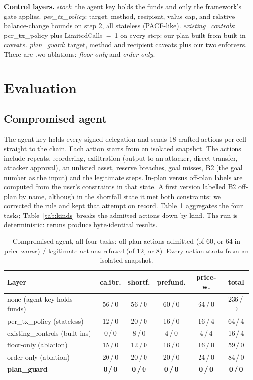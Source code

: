 \documentclass[conference]{IEEEtran}
\begin{document}
\textbf{Control layers.} \emph{stock}: the agent key holds the funds and only the framework's gate applies.
\emph{per\_tx\_policy}: target, method, recipient, value cap, and relative balance-change bounds on step 2, all
stateless (PACE-like). \emph{existing\_controls}: per\_tx\_policy plus LimitedCalls~=~1 on every step: our plan
built from built-in caveats. \emph{plan\_guard}: target, method and recipient caveats plus our two enforcers. There are two
ablations: \emph{floor-only} and \emph{order-only}.

\section{Evaluation}\label{sec:eval}

\subsection{Compromised agent}

The agent key holds every signed delegation and sends 18 crafted actions per cell straight to the chain. Each
action starts from an isolated snapshot. The actions include repeats, reordering, exfiltration (output to an attacker,
direct transfer, attacker approval), an unlisted asset, reserve breaches, goal misses, B2 (the goal number as the
input) and the legitimate steps. In-plan versus off-plan labels are computed from the user's constraints in that state. A first
version labelled B2 off-plan by name, although in the shortfall state it met both constraints; we corrected the rule
and kept that attempt on record. Table~\ref{tab:matrix} aggregates the four tasks; Table~\ref{tab:kinds} breaks the admitted
actions down by kind. The run is deterministic: reruns produce byte-identical results.

\begin{table}[t]
\centering
\caption{Compromised agent, all four tasks: off-plan actions admitted (of 60, or 64 in price-worse) / legitimate
actions refused (of 12, or 8). Every action starts from an isolated snapshot.}
\label{tab:matrix}
\setlength{\tabcolsep}{3pt}
\begin{tabular}{lccccc}
\toprule
Layer & calibr. & shortf. & prefund. & price-w. & total \\
\midrule
none (agent key holds funds) & 56\,/\,0 & 56\,/\,0 & 60\,/\,0 & 64\,/\,0 & 236\,/\,0 \\
per\_tx\_policy (stateless) & 12\,/\,0 & 20\,/\,0 & 16\,/\,0 & 16\,/\,4 & 64\,/\,4 \\
existing\_controls (built-ins) & 0\,/\,0 & 8\,/\,0 & 4\,/\,0 & 4\,/\,4 & 16\,/\,4 \\
floor-only (ablation) & 15\,/\,0 & 12\,/\,0 & 16\,/\,0 & 16\,/\,0 & 59\,/\,0 \\
order-only (ablation) & 20\,/\,0 & 20\,/\,0 & 20\,/\,0 & 24\,/\,0 & 84\,/\,0 \\
\textbf{plan\_guard} & \textbf{0\,/\,0} & \textbf{0\,/\,0} & \textbf{0\,/\,0} & \textbf{0\,/\,0} & \textbf{0\,/\,0} \\
\bottomrule
\end{tabular}
\end{table}
\end{document}
